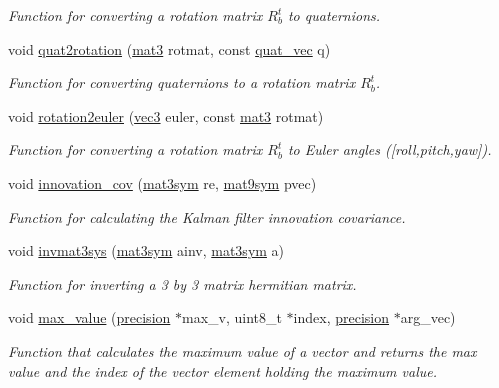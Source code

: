 \begin{DoxyCompactItemize}
\begin{DoxyCompactList}\small\item\em \-Function for converting a rotation matrix $R_b^t$ to quaternions. \end{DoxyCompactList}\item 
void \hyperlink{group__aux__func_ga9ac9f67ebac20a4953265127e3621f6c}{quat2rotation} (\hyperlink{nav__types_8h_ab7675278cb555aa98b43c97694753329}{mat3} rotmat, const \hyperlink{nav__types_8h_ad9a64f455fa02affaba6740746aae7b2}{quat\-\_\-vec} q)
\begin{DoxyCompactList}\small\item\em \-Function for converting quaternions to a rotation matrix $R_b^t$. \end{DoxyCompactList}\item 
void \hyperlink{group__aux__func_ga269e411a81080270d202618aece4f079}{rotation2euler} (\hyperlink{nav__types_8h_a90c683614d896321009d3b3c401b764f}{vec3} euler, const \hyperlink{nav__types_8h_ab7675278cb555aa98b43c97694753329}{mat3} rotmat)
\begin{DoxyCompactList}\small\item\em \-Function for converting a rotation matrix $R_b^t$ to \-Euler angles (\mbox{[}roll,pitch,yaw\mbox{]}). \end{DoxyCompactList}\item 
void \hyperlink{group__aux__func_ga5f9cb26cc3e73e922fac295a84401462}{innovation\-\_\-cov} (\hyperlink{nav__types_8h_a0407e05d4f0216c13cca22570399e44d}{mat3sym} re, \hyperlink{nav__types_8h_a0f4089eb3ad75e0675d7f7d3914fddeb}{mat9sym} pvec)
\begin{DoxyCompactList}\small\item\em \-Function for calculating the \-Kalman filter innovation covariance. \end{DoxyCompactList}\item 
void \hyperlink{group__aux__func_ga06b4d19c89f6b3af0ca6c25d541d350a}{invmat3sys} (\hyperlink{nav__types_8h_a0407e05d4f0216c13cca22570399e44d}{mat3sym} ainv, \hyperlink{nav__types_8h_a0407e05d4f0216c13cca22570399e44d}{mat3sym} a)
\begin{DoxyCompactList}\small\item\em \-Function for inverting a 3 by 3 matrix hermitian matrix. \end{DoxyCompactList}\item 
void \hyperlink{group__aux__func_gaa026397785026ed32818cf8008abffb3}{max\-\_\-value} (\hyperlink{nav__types_8h_a37e1884b1f06826c49607cec459b4e8a}{precision} $\ast$max\-\_\-v, uint8\-\_\-t $\ast$index, \hyperlink{nav__types_8h_a37e1884b1f06826c49607cec459b4e8a}{precision} $\ast$arg\-\_\-vec)
\begin{DoxyCompactList}\small\item\em \-Function that calculates the maximum value of a vector and returns the max value and the index of the vector element holding the maximum value. \end{DoxyCompactList}\end{DoxyCompactItemize}


